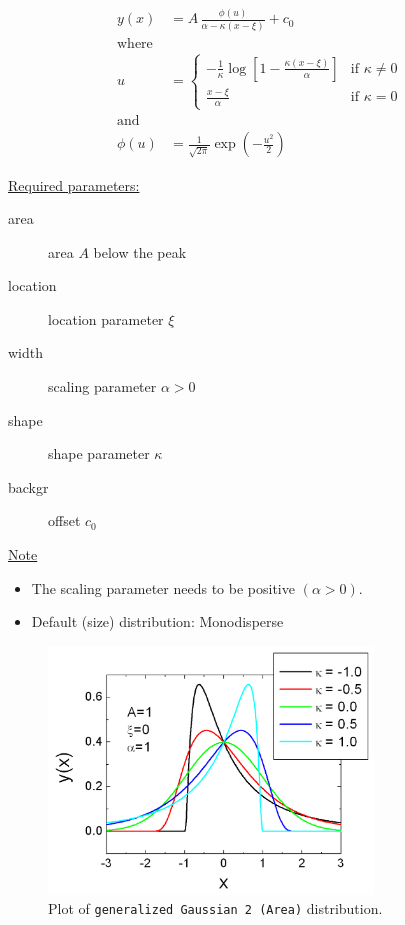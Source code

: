 \begin{subequations}
\begin{align}
y(x) &= A\, \frac{\phi(u)}{\alpha-\kappa(x-\xi)} + c_0\\
\text{where} & \nonumber \\
u &=
\begin{cases}
- \frac{1}{\kappa} \log \left[ 1-
\frac{\kappa(x-\xi)}{\alpha} \right] & \text{if } \kappa \neq 0 \\
\frac{x-\xi}{\alpha} & \text{if } \kappa=0
\end{cases} \\
\text{and} &  \nonumber \\
\phi(u) &= \frac{1}{\sqrt{2\pi}} \exp\left(-\frac{u^2}{2}\right)
\end{align}
\end{subequations}

\underline{Required parameters:}
\begin{description}
    \item[area] area $A$ below the peak
    \item[location] location parameter $\xi$
    \item[width] scaling parameter $\alpha > 0$
    \item[shape] shape parameter $\kappa$
    \item[backgr] offset $c_0$
\end{description}

\underline{Note}
\begin{itemize}
  \item The scaling parameter needs to be positive $(\alpha > 0)$.
  \item Default (size) distribution: Monodisperse
\end{itemize}

\begin{figure}[htb]
\begin{center}
\includegraphics[width=0.768\textwidth]{generalizedGaussian2Area.png}
\end{center}
\caption{Plot of \texttt{generalized Gaussian 2 (Area)}
distribution.} \label{fig:generalizedGaussian2Area}
\end{figure}

